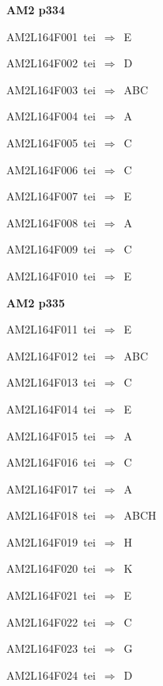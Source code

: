\par\vfill\eject
{\bf\hfill AM2 p334\hfill\hbox{}}\par\bigskip
{\sixrm AM2L164F001\ {\sixit tei}\ }$\Rightarrow$\ E\par\smallskip
{\sixrm AM2L164F002\ {\sixit tei}\ }$\Rightarrow$\ D\par\smallskip
{\sixrm AM2L164F003\ {\sixit tei}\ }$\Rightarrow$\ ABC\par\smallskip
{\sixrm AM2L164F004\ {\sixit tei}\ }$\Rightarrow$\ A\par\smallskip
{\sixrm AM2L164F005\ {\sixit tei}\ }$\Rightarrow$\ C\par\smallskip
{\sixrm AM2L164F006\ {\sixit tei}\ }$\Rightarrow$\ C\par\smallskip
{\sixrm AM2L164F007\ {\sixit tei}\ }$\Rightarrow$\ E\par\smallskip
{\sixrm AM2L164F008\ {\sixit tei}\ }$\Rightarrow$\ A\par\smallskip
{\sixrm AM2L164F009\ {\sixit tei}\ }$\Rightarrow$\ C\par\smallskip
{\sixrm AM2L164F010\ {\sixit tei}\ }$\Rightarrow$\ E\par\smallskip

\par\vfill\eject
{\bf\hfill AM2 p335\hfill\hbox{}}\par\bigskip
{\sixrm AM2L164F011\ {\sixit tei}\ }$\Rightarrow$\ E\par\smallskip
{\sixrm AM2L164F012\ {\sixit tei}\ }$\Rightarrow$\ ABC\par\smallskip
{\sixrm AM2L164F013\ {\sixit tei}\ }$\Rightarrow$\ C\par\smallskip
{\sixrm AM2L164F014\ {\sixit tei}\ }$\Rightarrow$\ E\par\smallskip
{\sixrm AM2L164F015\ {\sixit tei}\ }$\Rightarrow$\ A\par\smallskip
{\sixrm AM2L164F016\ {\sixit tei}\ }$\Rightarrow$\ C\par\smallskip
{\sixrm AM2L164F017\ {\sixit tei}\ }$\Rightarrow$\ A\par\smallskip
{\sixrm AM2L164F018\ {\sixit tei}\ }$\Rightarrow$\ ABCH\par\smallskip
{\sixrm AM2L164F019\ {\sixit tei}\ }$\Rightarrow$\ H\par\smallskip
{\sixrm AM2L164F020\ {\sixit tei}\ }$\Rightarrow$\ K\par\smallskip
{\sixrm AM2L164F021\ {\sixit tei}\ }$\Rightarrow$\ E\par\smallskip
{\sixrm AM2L164F022\ {\sixit tei}\ }$\Rightarrow$\ C\par\smallskip
{\sixrm AM2L164F023\ {\sixit tei}\ }$\Rightarrow$\ G\par\smallskip
{\sixrm AM2L164F024\ {\sixit tei}\ }$\Rightarrow$\ D\par\smallskip

